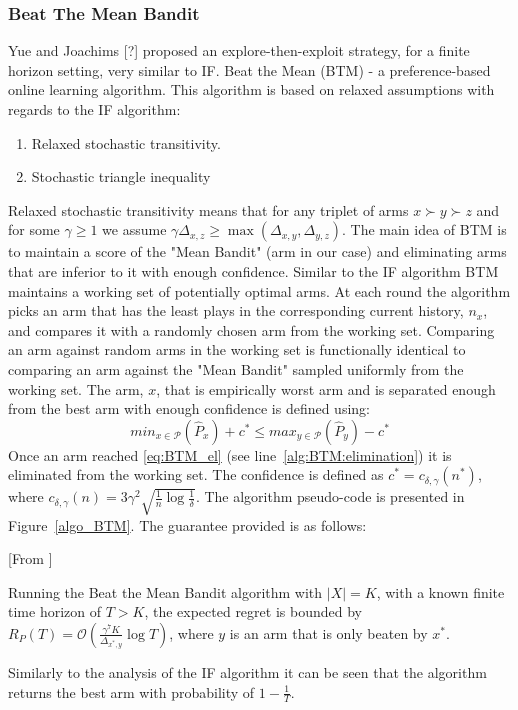\documentclass{llncs}
\begin{document}
\subsubsection{Beat The Mean Bandit}
	Yue and Joachims [?] proposed an explore-then-exploit strategy, for a finite horizon setting, very similar to IF. 
	Beat the Mean (BTM) - a preference-based online learning algorithm.
	This algorithm is based on relaxed assumptions with regards to the IF algorithm:
	\begin{enumerate}
		\item Relaxed stochastic transitivity.
		\item Stochastic triangle inequality
	\end{enumerate}
	Relaxed stochastic transitivity means that for any triplet of arms $x \succ y \succ z$ and for some $ \gamma \geq 1 $ we assume $\gamma\Delta_{x,z} \geq  \max(\Delta_{x,y},\Delta_{y,z})$.
	The main idea of BTM is to maintain a score of the "Mean Bandit" (arm in our case) and eliminating arms that are inferior to it with enough confidence.
	Similar to the IF algorithm BTM maintains a working set of potentially optimal arms.
	At each round the algorithm picks an arm that has the least plays in the corresponding current history, $n_x$, and compares it with a randomly chosen arm from the working set.
	Comparing an arm against random arms in the working set is functionally identical to comparing an arm against the "Mean Bandit" sampled uniformly from the working set.
	The arm, $x$,  that is empirically worst arm and is separated enough from the best arm with enough confidence is defined using:
	\begin{equation}\label{eq:BTM_el}
	min_{x\in \mathcal{P}} (\hat{P}_{x})+c^* \leq max_{y \in \mathcal{P}}(\hat{P}_{y})-c^*
\end{equation}	 
	Once an arm reached \eqref{eq:BTM_el} (see line~\ref{alg:BTM:elimination}) it is eliminated from the working set. The confidence is defined as $ c^* = c_{\delta, \gamma}(n^*) $, where $c_{\delta, \gamma}(n) = 3\gamma^2 \sqrt{\frac{1}{n}\log \frac{1}{\delta}}$.
	The algorithm pseudo-code is presented in Figure~\ref{algo_BTM}.	
	The guarantee provided is as follows:
	\begin{theorem}\label{thm:BTM}[From \cite{...}]

		Running the Beat the Mean Bandit algorithm with $|X|=K$, with a known finite time horizon of $T>K$, the expected regret is bounded by $R_P(T) = \mathcal{O} \left( \frac{\gamma^7K}{\Delta_{x^*,y}} \log T \right)$, where $y$ is an arm that is only beaten by $x^*$.

	\end{theorem}	
	Similarly to the analysis of the IF algorithm it can be seen that the algorithm returns the best arm with probability of $1-\frac{1}{T}$.	
	
\end{document}
